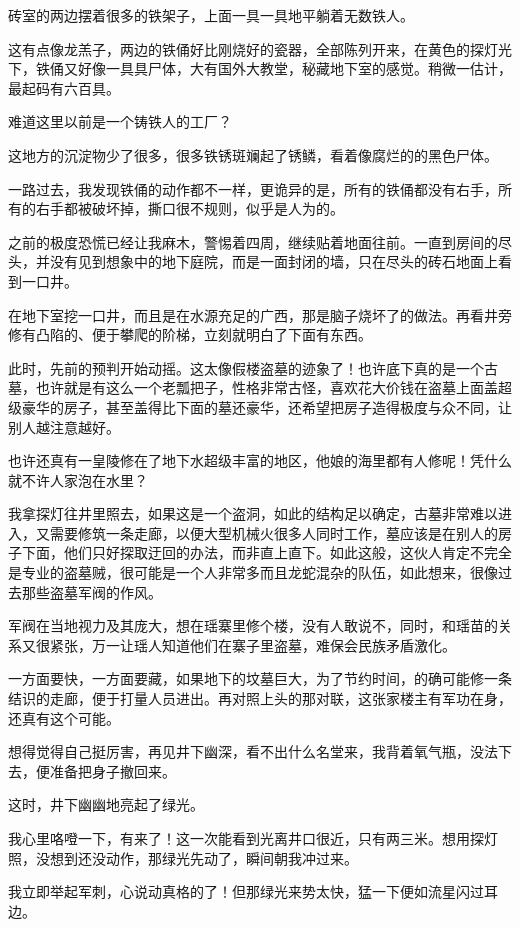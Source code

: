 砖室的两边摆着很多的铁架子，上面一具一具地平躺着无数铁人。

这有点像龙羔子，两边的铁俑好比刚烧好的瓷器，全部陈列开来，在黄色的探灯光下，铁俑又好像一具具尸体，大有国外大教堂，秘藏地下室的感觉。稍微一估计，最起码有六百具。

难道这里以前是一个铸铁人的工厂？

这地方的沉淀物少了很多，很多铁锈斑斓起了锈鳞，看着像腐烂的的黑色尸体。

一路过去，我发现铁俑的动作都不一样，更诡异的是，所有的铁俑都没有右手，所有的右手都被破坏掉，撕口很不规则，似乎是人为的。

之前的极度恐慌已经让我麻木，警惕着四周，继续贴着地面往前。一直到房间的尽头，并没有见到想象中的地下庭院，而是一面封闭的墙，只在尽头的砖石地面上看到一口井。

在地下室挖一口井，而且是在水源充足的广西，那是脑子烧坏了的做法。再看井旁修有凸陷的、便于攀爬的阶梯，立刻就明白了下面有东西。

此时，先前的预判开始动摇。这太像假楼盗墓的迹象了！也许底下真的是一个古墓，也许就是有这么一个老瓢把子，性格非常古怪，喜欢花大价钱在盗墓上面盖超级豪华的房子，甚至盖得比下面的墓还豪华，还希望把房子造得极度与众不同，让别人越注意越好。

也许还真有一皇陵修在了地下水超级丰富的地区，他娘的海里都有人修呢！凭什么就不许人家泡在水里？

我拿探灯往井里照去，如果这是一个盗洞，如此的结构足以确定，古墓非常难以进入，又需要修筑一条走廊，以便大型机械火很多人同时工作，墓应该是在别人的房子下面，他们只好探取迂回的办法，而非直上直下。如此这般，这伙人肯定不完全是专业的盗墓贼，很可能是一个人非常多而且龙蛇混杂的队伍，如此想来，很像过去那些盗墓军阀的作风。

军阀在当地视力及其庞大，想在瑶寨里修个楼，没有人敢说不，同时，和瑶苗的关系又很紧张，万一让瑶人知道他们在寨子里盗墓，难保会民族矛盾激化。

一方面要快，一方面要藏，如果地下的坟墓巨大，为了节约时间，的确可能修一条结识的走廊，便于打量人员进出。再对照上头的那对联，这张家楼主有军功在身，还真有这个可能。

想得觉得自己挺厉害，再见井下幽深，看不出什么名堂来，我背着氧气瓶，没法下去，便准备把身子撤回来。

这时，井下幽幽地亮起了绿光。

我心里咯噔一下，有来了！这一次能看到光离井口很近，只有两三米。想用探灯照，没想到还没动作，那绿光先动了，瞬间朝我冲过来。

我立即举起军刺，心说动真格的了！但那绿光来势太快，猛一下便如流星闪过耳边。

